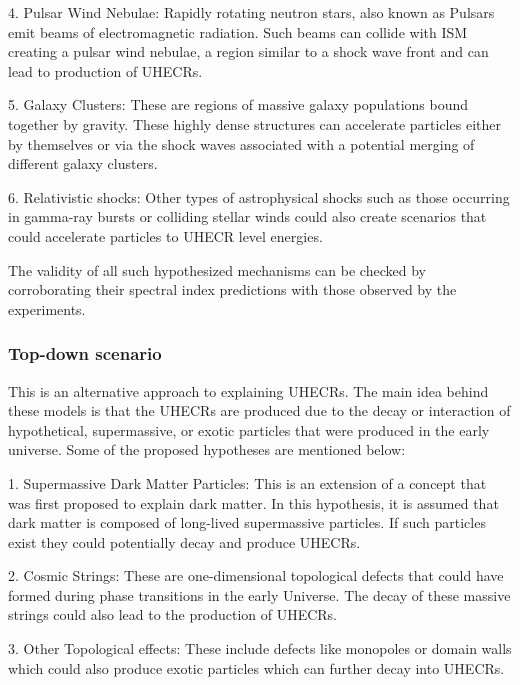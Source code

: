 4. Pulsar Wind Nebulae: Rapidly rotating neutron stars, also known as Pulsars emit beams of electromagnetic radiation. Such beams can collide with ISM creating a pulsar wind nebulae, a region similar to a shock wave front and can lead to production of UHECRs.~\cite{Cerutti_2020}

5. Galaxy Clusters: These are regions of massive galaxy populations bound together by gravity. These highly dense structures can accelerate particles either by themselves or via the shock waves associated with a potential merging of different galaxy clusters.~\cite{Murase_2008,Condorelli_2023} 

6. Relativistic shocks: Other types of astrophysical shocks such as those occurring in gamma-ray bursts or colliding stellar winds could also create scenarios that could accelerate particles to UHECR level energies.~\cite{Kirk_2000,10.1046/j.1365-8711.2001.04851.x}

The validity of all such hypothesized mechanisms can be checked by corroborating their spectral index predictions with those observed by the experiments. 

\subsubsection{Top-down scenario}
\label{subsec:Tdownsce}
This is an alternative approach to explaining UHECRs. The main idea behind these models is that the UHECRs are produced due to the decay or interaction of hypothetical, supermassive, or exotic particles that were produced in the early universe. Some of the proposed hypotheses are mentioned below:

1. Supermassive Dark Matter Particles: This is an extension of a concept that was first proposed to explain dark matter. In this hypothesis, it is assumed that dark matter is composed of long-lived supermassive particles. If such particles exist they could potentially decay and produce UHECRs.~\cite{ALOISIO2008307,MARZOLA201756}

2. Cosmic Strings: These are one-dimensional topological defects that could have formed during phase transitions in the early Universe. The decay of these massive strings could also lead to the production of UHECRs.~\cite{BHATTACHARJEE2000109,PhysRevD.64.043004}

3. Other Topological effects: These include defects like monopoles or domain walls which could also produce exotic particles which can further decay into UHECRs.~\cite{PhysRevLett.79.5202} 

